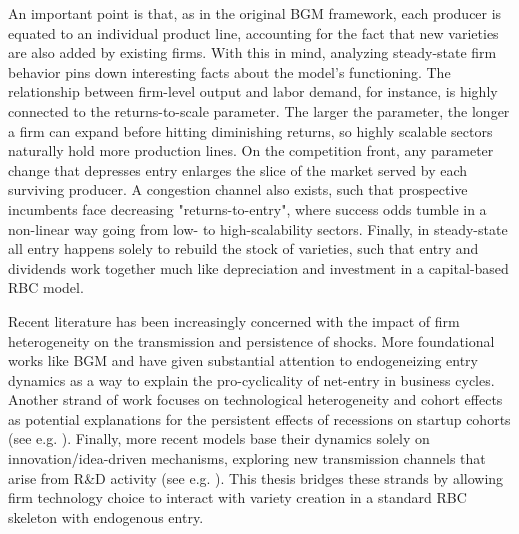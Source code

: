 \documentclass[a4paper,12pt]{article} %
\numberwithin{equation}{section} %
\numberwithin{figure}{section}
\numberwithin{table}{section}
\begin{document}
An important point is that, as in the original BGM framework, each producer is equated to an individual product line, accounting for the fact that new varieties
are also added by existing firms. With this in mind, analyzing steady-state firm behavior pins down interesting facts about the model's functioning. 
The relationship between firm-level output and labor demand, for instance, is highly connected to the returns-to-scale parameter. The larger the 
parameter, the longer a firm can expand before hitting diminishing returns, so highly scalable sectors naturally hold more production lines. On the 
competition front, any parameter change that depresses entry enlarges the slice of the market served by each surviving producer. A congestion channel also
exists, such that prospective incumbents face decreasing "returns-to-entry", where success odds tumble in a non-linear way going from low- to high-scalability sectors.
Finally, in steady-state all entry happens solely to rebuild the stock of varieties, such that entry and dividends work together much like depreciation and
investment in a capital-based RBC model.


Recent literature has been increasingly concerned with the impact of firm heterogeneity on the transmission and persistence of shocks. More foundational works 
like BGM and \textcite{ghironi2007trade} have given substantial attention to endogeneizing entry dynamics as a way to explain the pro-cyclicality of net-entry in 
business cycles.
Another strand of work focuses on technological heterogeneity and cohort effects as potential explanations for the persistent effects of recessions on startup cohorts
(see e.g. \cite{sedlavcek2017growth,clementi2016entry}). Finally, more recent models base their dynamics solely on innovation/idea-driven mechanisms, exploring
new transmission channels that arise from R\&D activity (see e.g. \cite{anzoategui2019endogenous,comin2006medium}). This thesis bridges these strands by allowing firm technology choice to interact with variety creation
in a standard RBC skeleton with endogenous entry.
\end{document}

